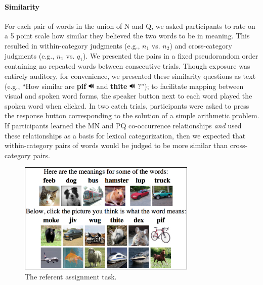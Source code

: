 \documentclass[man,floatsintext]{apa6}
\begin{document}
\paragraph{Similarity}
For each pair of words in the union of N and Q, we asked participants to rate on a 5 point scale how similar they believed the two words to be in meaning. This resulted in within-category judgments (e.g., $n_1$ vs. $n_2$) and cross-category judgments (e.g., $n_1$ vs. $q_1$). We presented the pairs in a fixed pseudorandom order containing no repeated words between consecutive trials. Though exposure was entirely auditory, for convenience, we presented these similarity questions as text (e.g., ``How similar are \textbf{pif} \includegraphics[width=0.3cm]{play.png} and \textbf{thite} \includegraphics[width=0.3cm]{play.png} ?''); to facilitate mapping between visual and spoken word forms, the speaker button next to each word played the spoken word when clicked. In two catch trials, participants were asked to press the response button corresponding to the solution of a simple arithmetic problem. If participants learned the MN and PQ co-occurrence relationships \emph{and} used these relationships as a basis for lexical categorization, then we expected that within-category pairs of words would be judged to be more similar than cross-category pairs.

\begin{figure}[t]
  \begin{center}
    \includegraphics[width=8.5cm]{meaning-html-cropped.png}
    \caption{The referent assignment task.}
    \label{meaning-task}
  \end{center}
\end{figure}
\end{document}
